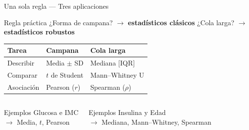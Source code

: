 \documentclass[aspectratio=169,10pt]{beamer}
\begin{document}
\begin{frame}{Una sola regla --- Tres aplicaciones}

\begin{block}{Regla práctica}
\centering
\small
¿Forma de campana? $\rightarrow$ \textbf{estadísticos clásicos} \hspace{1cm}
¿Cola larga? $\rightarrow$ \textbf{estadísticos robustos}
\end{block}

\vspace{2mm}

\small
\renewcommand{\arraystretch}{1.3}
\begin{tabular}{p{3.0cm} p{3.2cm} p{3.2cm}}
\toprule
\textbf{Tarea} & \textbf{Campana} & \textbf{Cola larga} \\
\midrule
Describir & Media $\pm$ SD & Mediana [IQR] \\
Comparar & $t$ de Student & Mann--Whitney U \\
Asociación & Pearson ($r$) & Spearman ($\rho$) \\
\bottomrule
\end{tabular}

\vspace{3mm}

\begin{columns}[T,onlytextwidth]
\begin{exampleblock}{Ejemplos}
\footnotesize
Glucosa e IMC\\
$\rightarrow$ Media, $t$, Pearson
\end{exampleblock}

\begin{block}{Ejemplos}
\footnotesize
Insulina y Edad\\
$\rightarrow$ Mediana, Mann--Whitney, Spearman
\end{block}
\end{columns}


\end{frame}
\end{document}
